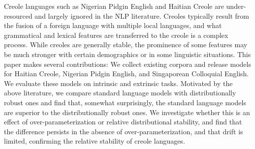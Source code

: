 Creole languages such as Nigerian Pidgin English and Haitian Creole are under-resourced and largely ignored in the NLP literature. Creoles typically result from the fusion of a foreign language with multiple local languages, and what grammatical and lexical features are transferred to the creole is a complex process. While creoles are generally stable, the prominence of some features may be much stronger with certain demographics or in some linguistic situations. This paper makes several contributions: We collect existing corpora and release models for Haitian Creole, Nigerian Pidgin English, and Singaporean Colloquial English. We evaluate these models on intrinsic and extrinsic tasks. Motivated by the above literature, we compare standard language models with distributionally robust ones and find that, somewhat surprisingly, the standard language models are superior to the distributionally robust ones. We investigate whether this is an effect of over-parameterization or relative distributional stability, and find that the difference persists in the absence of over-parameterization, and that drift is limited, confirming the relative stability of creole languages.
